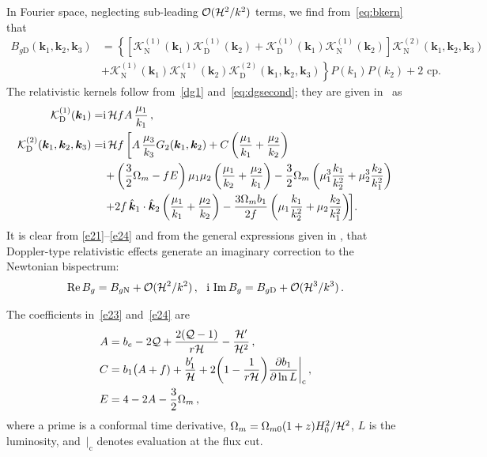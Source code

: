 In Fourier space, neglecting sub-leading $ \mathcal{O}(\mathcal{H}^2/k^2)$ terms, we find from~\eqref{eq:bkern} that
\begin{align}
 B_{g\mathrm{D}}(\bm{k}_{1},\bm{k}_{2},\bm{k}_{3}) &=  \left\{\left[\mathcal{K}^{(1)}_{\mathrm{N}}(\bm{k}_{1})\mathcal{K}^{(1)}_{\mathrm{D}}(\bm{k}_{2}) + \mathcal{K}^{(1)}_{\mathrm{D}}(\bm{k}_{1})\mathcal{K}^{(1)}_{\mathrm{N}}(\bm{k}_{2})\right]\mathcal{K}^{(2)}_{\mathrm{N}}(\bm{k}_{1},\bm{k}_{2},\bm{k}_{3}) \right. \nonumber \\
& \left. +\mathcal{K}^{(1)}_{\mathrm{N}}(\bm{k}_{1})\mathcal{K}^{(1)}_{\mathrm{N}}(\bm{k}_{2})\mathcal{K}^{(2)}_{\mathrm{D}}(\bm{k}_{1},\bm{k}_{2},\bm{k}_{3})\right\}P(k_{1})P(k_{2})+\text{2 cp}. \label{e21}
\end{align}
The relativistic kernels follow from~\eqref{dg1} and~\eqref{eq:dgsecond}; they are given in~\cite{Clarkson:2018dwn} as
\begin{align}
\mathcal{K}^{(1)}_{\mathrm{D}}(\bm{k}_{1}) =& \mathrm{i}\,\mathcal{H} f A\,\frac{\mu_{1}}{k_{1}}\,, \label{e23} \\
\mathcal{K}^{(2)}_{\mathrm{D}}(\bm{k}_{1},\bm{k}_{2},\bm{k}_{3}) =& \mathrm{i}\,\mathcal{H} f \left[
A\,\frac{\mu_{3}}{k_{3}}G_{2}(\bm{k}_{1},\bm{k}_{2})
+C\left(\frac{\mu_{1}}{k_{1}} + \frac{\mu_{2}}{k_{2}}\right) \right. \nonumber \\
&\left.  +\left(\frac{3}{2}\Omega_{m}-fE\right)\mu_{1}\mu_{2}\left(\frac{\mu_{1}}{k_{2}}+\frac{\mu_{2}}{k_{1}}\right)  -\frac{3}{2}\Omega_{m}\left(\mu_{1}^{3}\frac{k_{1}}{k_{2}^{2}} + \mu_{2}^{3}\frac{k_{2}}{k_{1}^{2}}\right) \right. \nonumber \\
&\left. +2f\,  {\hat{\bm{k}}_{1} \cdot \hat{\bm{k}}_2}\left(\frac{\mu_{1}}{k_{1}} + \frac{\mu_{2}}{k_{2}}\right) 
 -\frac{3\Omega_{m}b_1}{2f}\left(\mu_{1}\frac{k_{1}}{k_{2}^{2}} + \mu_{2}\frac{k_{2}}{k_{1}^{2}}\right)\!  \right]\! .~~~ \label{e24}
\end{align}
It is clear from \eqref{e21}--\eqref{e24} and from the general expressions given in {\cite{Umeh:2016nuh,Jolicoeur:2017nyt}}, that Doppler-type relativistic effects generate an imaginary correction to the Newtonian bispectrum: 
\begin{equation}
{{\mathrm{Re}}\, B_g =B_{g\mathrm{N}} + \mathcal{O}(\mathcal{H}^2/k^2)\,,~~ {\mathrm{i\,}}\, {\mathrm{Im}}\, B_g = B_{g\mathrm{D}}+ \mathcal{O}(\mathcal{H}^3/k^3)}\,. \label{bgnd}
\end{equation}

The  coefficients in~\eqref{e23} and~\eqref{e24} are~\cite{Clarkson:2018dwn}
\begin{align}
A &= b_{e} - 2\mathcal{Q} + \frac{2(\mathcal{Q}-1)}{{r} \mathcal{H}}
 - \frac{\mathcal{H}'}{\mathcal{H}^{2}} \label{e25} \,, \\
C &= b_{1}\big(A+f) + \frac{b_1'}{\mathcal{H}} + 2\bigg(1-\frac{1}{{r} \mathcal{H}}\bigg){\frac{\partial b_1}{\partial \ln{L}}\bigg|_{\mathrm{c}}} \label{e26}\,, \\
E &= 4-2A-\frac{3}{2}\Omega_{m} \label{e27} \,,
\end{align}
where a prime is a conformal time derivative, $\Omega_m=\Omega_{m0}(1+z)H_0^2/\mathcal{H}^2$,  $L$ is the  luminosity, and $\,|_{\mathrm{c}}$ denotes evaluation at the flux cut. 

